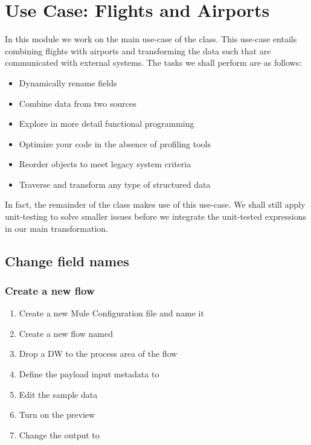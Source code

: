\chapter{Use Case: Flights and Airports}

In this module we work on the main use-case of the class.  This use-case entails combining flights with airports and transforming the data such that are communicated with external systems. The tasks we shall perform are as follows:
\begin{itemize}
\item Dynamically rename fields
\item Combine data from two sources
\item Explore in more detail functional programming
\item Optimize your code in the absence of profiling tools
\item Reorder objects to meet legacy system criteria
\item Traverse and transform any type of structured data
\end{itemize}
In fact, the remainder of the class makes use of this use-case.  We shall still apply unit-testing to solve smaller issues before we integrate the unit-tested expressions in our main transformation. 

\section{Change field names}

\subsection{Create a new flow}
\begin{enumerate}
\item Create a new Mule Configuration file and name it 
\item Create a new flow named 
\item Drop a DW to the process area of the flow
\item Define the payload input metadata to  
\item Edit the sample data
\item Turn on the preview
\item Change the output to 
\end{enumerate}

